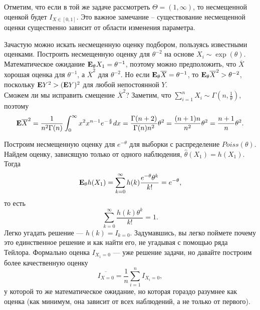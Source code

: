 \documentclass[10 pt,russian]{report}
\begin{document}
\Exam Отметим, что если в той же задаче рассмотреть $\Theta = (1,\infty)$, то несмещенной оценкой будет $I_{X\in [0,1]}$. Это важное замечание -- существование несмещенной оценки существенно зависит от области изменения параметра.

Зачастую можно искать несмещенную оценку подбором, пользуясь известными оценками.
\Exam
\label{ExExp}
 Построить несмещенную оценку для $\theta^{-2}$ на основе $X_i\sim \exp(\theta)$.\\
Математическое ожидание ${\bf E}_{\theta}X_1=\theta^{-1}$, поэтому можно предположить, что $\overline{X}$ хорошая оценка для $\theta^{-1}$, а $\overline{X}^2$ для $\theta^{-2}$. Но если ${\bf E}_{\theta}\overline{X}=\theta^{-1}$, то ${\bf E}_{\theta}\overline{X}^2>\theta^{-2}$, поскольку ${\bf E}Y^2>({\bf E}Y)^2$ для любой непостоянной $Y$.\\
Сможем ли мы исправить смещение $\overline{X}^2$? Заметим, что $\sum_{i=1}^{n} X_i\sim \Gamma\left(n,\frac1{\theta}\right)$, поэтому 
$${\bf E}\overline{X}^2 = \frac1{n^2 \Gamma(n)} \int_{0}^{\infty} x^2  x^{n-1}e^{-\frac{x}{\theta}} dx = \frac{\Gamma(n+2)}{\Gamma(n) n^2}\theta^2 = \frac{(n+1)n}{n^2}\theta^2 = \frac{n+1}{n} \theta^2.$$


\Exam Построим несмещенную оценку для $e^{-\theta}$ для выборки с распределение $Poiss(\theta)$.\\
Найдем оценку, зависящую только от одного наблюдения, $\widehat{\theta}(X_1) = h(X_1)$. Тогда
$${\bf E}_{\theta} h(X_1) = \sum_{k=0}^{\infty} h(k) \frac{e^{-\theta} \theta^k}{k!} = e^{-\theta},$$
то есть
$$\sum_{k=0}^{\infty} \frac{h(k) \theta^k}{k!} = 1.$$
Легко угадать решение --- $h(k)=I_{k=0}$. Задумавшись, вы легко поймете почему это единственное решение и как найти его, не угадывая с помощью ряда Тейлора.
Формально оценка $I_{X_1=0}$ --- уже решение задачи, но давайте построим более качественную оценку
$$\overline{I_{X=0}} = \frac1n \sum_{i=1}^{n} I_{X_i=0},$$
у которой то же математическое ожидание, но которая гораздо разумнее как оценка (как минимум, она зависит от всех наблюдений, а не только от первого).
\end{document}
